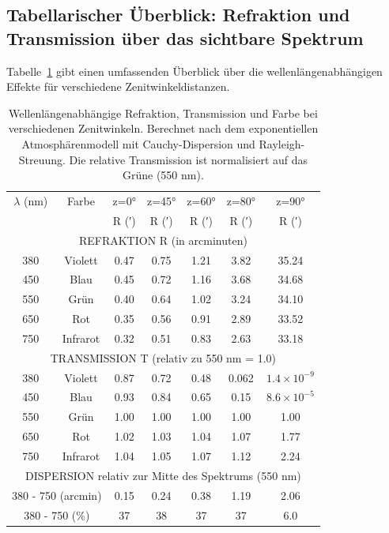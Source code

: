\documentclass[12pt,a4paper]{article}
\begin{document}
\subsection{Tabellarischer Überblick: Refraktion und Transmission über das sichtbare Spektrum}
\label{subsec:comprehensive_table}

Tabelle~\ref{tab:dispersion_comprehensive} gibt einen umfassenden Überblick über
die wellenlängenabhängigen Effekte für verschiedene Zenitwinkeldistanzen.

\begin{table}[p]
	\centering
	\caption{Wellenlängenabhängige Refraktion, Transmission und Farbe bei verschiedenen Zenitwinkeln.
	         Berechnet nach dem exponentiellen Atmosphärenmodell mit Cauchy-Dispersion und
	         Rayleigh-Streuung. Die relative Transmission ist normalisiert auf das Grüne (550 nm).}
	\label{tab:dispersion_comprehensive}
	\begin{tabular}{ccccccc}
		\toprule
		$\lambda$ (nm) & Farbe & z=0° & z=45° & z=60° & z=80° & z=90° \\
		& & R (′) & R (′) & R (′) & R (′) & R (′) \\
		\midrule
		\multicolumn{7}{c}{REFRAKTION R (in arcminuten)} \\
		\midrule
		380 & Violett & 0.47 & 0.75 & 1.21 & 3.82 & 35.24 \\
		450 & Blau & 0.45 & 0.72 & 1.16 & 3.68 & 34.68 \\
		550 & Grün & 0.40 & 0.64 & 1.02 & 3.24 & 34.10 \\
		650 & Rot & 0.35 & 0.56 & 0.91 & 2.89 & 33.52 \\
		750 & Infrarot & 0.32 & 0.51 & 0.83 & 2.63 & 33.18 \\
		\midrule
		\multicolumn{7}{c}{TRANSMISSION T (relativ zu 550 nm = 1.0)} \\
		\midrule
		380 & Violett & 0.87 & 0.72 & 0.48 & 0.062 & $1.4 \times 10^{-9}$ \\
		450 & Blau & 0.93 & 0.84 & 0.65 & 0.15 & $8.6 \times 10^{-5}$ \\
		550 & Grün & 1.00 & 1.00 & 1.00 & 1.00 & 1.00 \\
		650 & Rot & 1.02 & 1.03 & 1.04 & 1.07 & 1.77 \\
		750 & Infrarot & 1.04 & 1.05 & 1.07 & 1.12 & 2.24 \\
		\midrule
		\multicolumn{7}{c}{DISPERSION relativ zur Mitte des Spektrums (550 nm)} \\
		\midrule
		\multicolumn{2}{c}{380 - 750 (arcmin)} & 0.15 & 0.24 & 0.38 & 1.19 & 2.06 \\
		\multicolumn{2}{c}{380 - 750 (\%)} & 37 & 38 & 37 & 37 & 6.0 \\
		\bottomrule
	\end{tabular}
\end{table}
\end{document}
